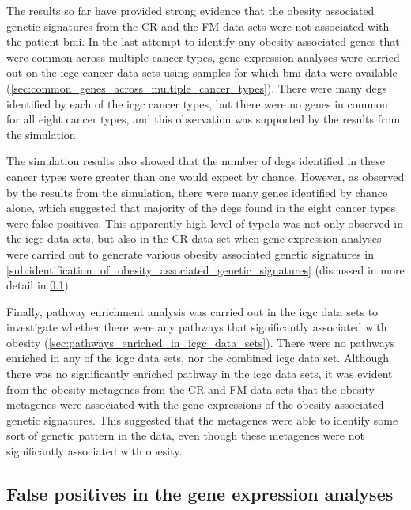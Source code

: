 The results so far have provided strong evidence that the obesity associated genetic signatures from the CR and the FM data sets were not associated with the patient \gls{bmi}.
In the last attempt to identify any obesity associated genes that were common across multiple cancer types, gene expression analyses were carried out on the \gls{icgc} cancer data sets using samples for which \gls{bmi} data were available (\cref{sec:common_genes_across_multiple_cancer_types}).
There were many \glspl{deg} identified by each of the \gls{icgc} cancer types, but there were no genes in common for all eight cancer types, and this observation was supported by the results from the simulation.

The simulation results also showed that the number of \glspl{deg} identified in these cancer types were greater than one would expect by chance.
However, as observed by the results from the simulation, there were many genes identified by chance alone, which suggested that majority of the \glspl{deg} found in the eight cancer types were false positives.
This apparently high level of \Glspl{type1} was not only observed in the \gls{icgc} data sets, but also in the CR data set when gene expression analyses were carried out to generate various obesity associated genetic signatures in \cref{sub:identification_of_obesity_associated_genetic_signatures} (discussed in more detail in \cref{sub:false_positives_in_gene_expression_analyses}).

Finally, pathway enrichment analysis was carried out in the \gls{icgc} data sets to investigate whether there were any pathways that significantly associated with obesity (\cref{sec:pathways_enriched_in_icgc_data_sets}).
There were no pathways enriched in any of the \gls{icgc} data sets, nor the combined \gls{icgc} data set.
Although there was no significantly enriched  pathway in the \gls{icgc} data sets, it was evident from the obesity metagenes from the CR and FM data sets that the obesity metagenes were associated with the gene expressions of the obesity associated genetic signatures.
This suggested that the metagenes were able to identify some sort of genetic pattern in the data, even though these metagenes were not significantly associated with obesity.

\subsection{False positives in the gene expression analyses}
\label{sub:false_positives_in_gene_expression_analyses}

